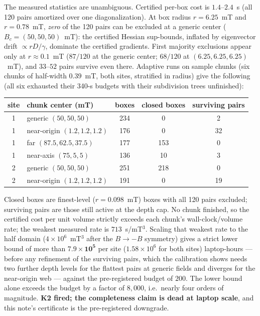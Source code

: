 \documentclass[11pt]{amsart}
\theoremstyle{plain}
\theoremstyle{definition}
\theoremstyle{remark}
\begin{document}
The measured statistics are unambiguous.  Certified per-box cost is
$1.4$--$2.4$~s (all 120 pairs amortized over one diagonalization).  At box radius
$r=6.25$~mT and $r=0.78$~mT, \emph{zero} of the 120 pairs can be excluded at a
generic center ($B_c=(50,50,50)$~mT): the certified Hessian sup-bounds, inflated
by eigenvector drift $\propto rD/\gamma$, dominate the certified gradients.
First majority exclusions appear only at $r\approx0.1$~mT ($87/120$ at the
generic center; $68/120$ at $(6.25,6.25,6.25)$~mT), and $33\text{--}52$ pairs
survive even there.  Adaptive runs on sample chunks (six chunks of half-width
$0.39$~mT, both sites, stratified in radius) give
the following (all six exhausted their 340-s budgets with their
subdivision trees unfinished):
\begin{center}\small
\begin{tabular}{clccc}
\toprule
site & chunk center (mT) & boxes & closed boxes & surviving pairs \\
\midrule
1 & generic $(50,50,50)$ & 234 & 0 & 2 \\
1 & near-origin $(1.2,1.2,1.2)$ & 176 & 0 & 32 \\
1 & far $(87.5,62.5,37.5)$ & 177 & 153 & 0 \\
1 & near-axis $(75,5,5)$ & 136 & 10 & 3 \\
2 & generic $(50,50,50)$ & 251 & 218 & 0 \\
2 & near-origin $(1.2,1.2,1.2)$ & 191 & 0 & 19 \\
\bottomrule
\end{tabular}
\end{center}
Closed boxes are finest-level ($r=0.098$~mT) boxes with all 120 pairs
excluded; surviving pairs are those still active at the depth cap.  No
chunk finished, so the certified cost per unit volume strictly exceeds
each chunk's wall-clock/volume rate; the weakest measured rate is
$713$~s/mT$^3$.
Scaling that weakest rate to the half
domain ($4\times10^{6}$~mT$^3$ after the $B\to-B$ symmetry) gives a strict
lower bound of
more than $\mathbf{7.9\times10^{5}}$ per site ($1.58\times10^{6}$ for both sites)
laptop-hours --- before any refinement of the surviving pairs, which the
calibration shows needs two further depth levels for the flattest pairs at
generic fields and diverges for the near-origin web --- against the
pre-registered budget of $200$.  The lower bound alone exceeds the budget by
a factor of $8{,}000$, i.e.\ nearly four orders of magnitude.  \textbf{K2 fired; the completeness claim is dead at laptop scale},
and this note's certificate is the pre-registered downgrade.
\end{document}
